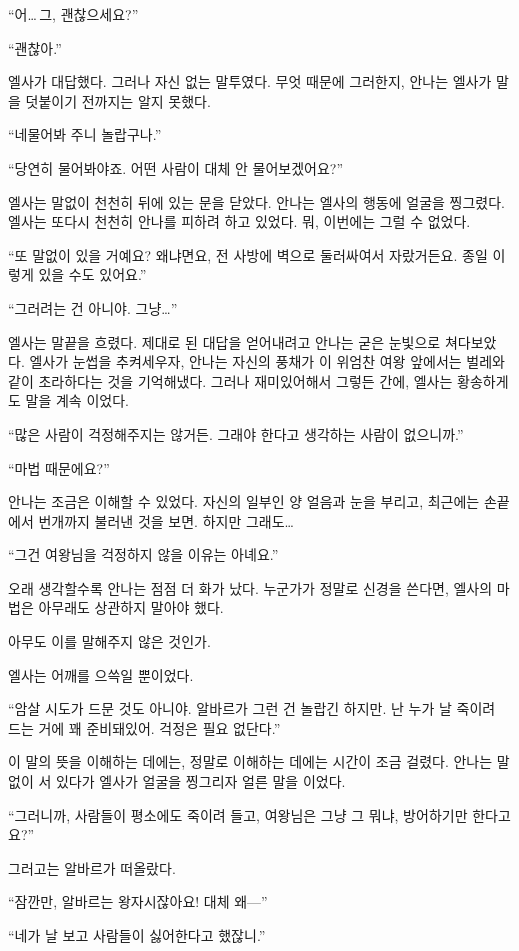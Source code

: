 ``어\ldots\,그, 괜찮으세요?''

``괜찮아.''

엘사가 대답했다. 그러나 자신 없는 말투였다. 무엇 때문에 그러한지, 안나는 엘사가 말을 덧붙이기 전까지는 알지 못했다.

``네 물어봐 주니 놀랍구나.''

``당연히 물어봐야죠. 어떤 사람이 대체 안 물어보겠어요?''

엘사는 말없이 천천히 뒤에 있는 문을 닫았다. 안나는 엘사의 행동에 얼굴을 찡그렸다. 엘사는 또다시 천천히 안나를 피하려 하고 있었다. 뭐, 이번에는 그럴 수 없었다.

``또 말없이 있을 거예요? 왜냐면요, 전 사방에 벽으로 둘러싸여서 자랐거든요. 종일 이렇게 있을 수도 있어요.''

``그러려는 건 아니야. 그냥\ldots''

엘사는 말끝을 흐렸다. 제대로 된 대답을 얻어내려고 안나는 굳은 눈빛으로 쳐다보았다. 엘사가 눈썹을 추켜세우자, 안나는 자신의 풍채가 이 위엄찬 여왕 앞에서는 벌레와 같이 초라하다는 것을 기억해냈다. 그러나 재미있어해서 그렇든 간에, 엘사는 황송하게도 말을 계속 이었다.

``많은 사람이 걱정해주지는 않거든. 그래야 한다고 생각하는 사람이 없으니까.''

``마법 때문에요?''

안나는 조금은 이해할 수 있었다. 자신의 일부인 양 얼음과 눈을 부리고, 최근에는 손끝에서 번개까지 불러낸 것을 보면. 하지만 그래도\ldots

``그건 여왕님을 걱정하지 않을 이유는 아녜요.''

오래 생각할수록 안나는 점점 더 화가 났다. 누군가가 정말로 신경을 쓴다면, 엘사의 마법은 아무래도 상관하지 말아야 했다.

아무도 이를 말해주지 않은 것인가.

엘사는 어깨를 으쓱일 뿐이었다.

``암살 시도가 드문 것도 아니야. 알바르가 그런 건 놀랍긴 하지만. 난 누가 날 죽이려 드는 거에 꽤 준비돼있어. 걱정은 필요 없단다.''

이 말의 뜻을 이해하는 데에는, 정말로 이해하는 데에는 시간이 조금 걸렸다. 안나는 말없이 서 있다가 엘사가 얼굴을 찡그리자 얼른 말을 이었다.

``그러니까, 사람들이 평소에도 죽이려 들고, 여왕님은 그냥 그 뭐냐, 방어하기만 한다고요?''

그러고는 알바르가 떠올랐다.

``잠깐만, 알바르는 왕자시잖아요! 대체 왜—''

``네가 날 보고 사람들이 싫어한다고 했잖니.''

